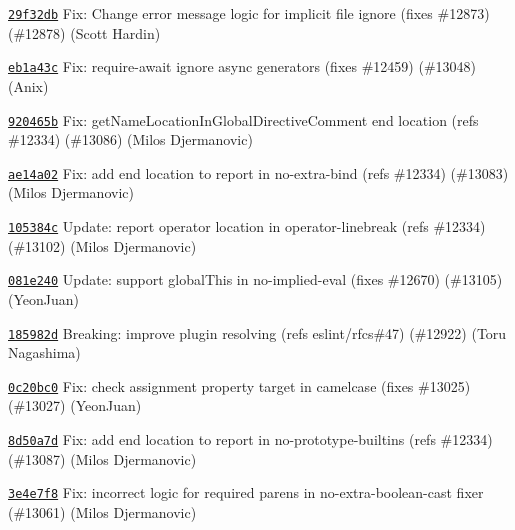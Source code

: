 \begin{DoxyItemize}
\item \href{https://github.com/eslint/eslint/commit/29f32db68c921a857e17ae627923d87b9c8708de}{\texttt{ {\ttfamily 29f32db}}} Fix\+: Change error message logic for implicit file ignore (fixes \#12873) (\#12878) (Scott Hardin)
\item \href{https://github.com/eslint/eslint/commit/eb1a43ce3113c906800192c3ef766d2ff188776f}{\texttt{ {\ttfamily eb1a43c}}} Fix\+: require-\/await ignore async generators (fixes \#12459) (\#13048) (Anix)
\item \href{https://github.com/eslint/eslint/commit/920465b5d8d291df8bce7eef8a066b1dd43d8cae}{\texttt{ {\ttfamily 920465b}}} Fix\+: get\+Name\+Location\+In\+Global\+Directive\+Comment end location (refs \#12334) (\#13086) (Milos Djermanovic)
\item \href{https://github.com/eslint/eslint/commit/ae14a021bbea5117fe366ae4ed235e8f08dc65a8}{\texttt{ {\ttfamily ae14a02}}} Fix\+: add end location to report in no-\/extra-\/bind (refs \#12334) (\#13083) (Milos Djermanovic)
\item \href{https://github.com/eslint/eslint/commit/105384ccc11dcd7303104fb5a347eda1d4d48357}{\texttt{ {\ttfamily 105384c}}} Update\+: report operator location in operator-\/linebreak (refs \#12334) (\#13102) (Milos Djermanovic)
\item \href{https://github.com/eslint/eslint/commit/081e24022a40d9a026ddd2a85c68cb8c3f18dc53}{\texttt{ {\ttfamily 081e240}}} Update\+: support global\+This in no-\/implied-\/eval (fixes \#12670) (\#13105) (Yeon\+Juan)
\item \href{https://github.com/eslint/eslint/commit/185982d5615d325ae8b45c2360d5847df4098bda}{\texttt{ {\ttfamily 185982d}}} Breaking\+: improve plugin resolving (refs eslint/rfcs\#47) (\#12922) (Toru Nagashima)
\item \href{https://github.com/eslint/eslint/commit/0c20bc068e608869981a10711bba88ffde1539d8}{\texttt{ {\ttfamily 0c20bc0}}} Fix\+: check assignment property target in camelcase (fixes \#13025) (\#13027) (Yeon\+Juan)
\item \href{https://github.com/eslint/eslint/commit/8d50a7d82244d4912f3eab62a66c81c76c44a9da}{\texttt{ {\ttfamily 8d50a7d}}} Fix\+: add end location to report in no-\/prototype-\/builtins (refs \#12334) (\#13087) (Milos Djermanovic)
\item \href{https://github.com/eslint/eslint/commit/3e4e7f8d429dc70b78c0aefaa37f9c22a1e5fc0f}{\texttt{ {\ttfamily 3e4e7f8}}} Fix\+: incorrect logic for required parens in no-\/extra-\/boolean-\/cast fixer (\#13061) (Milos Djermanovic)

\end{DoxyItemize}

